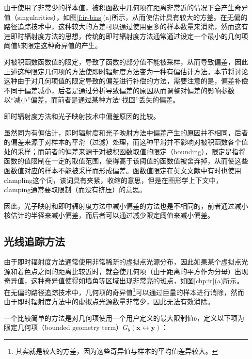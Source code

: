由于使用了非常少的样本值，被积函数中几何项在距离非常近的情况下会产生奇异值（singularities），如图\ref{f:ir-bias}(a)所示，从而使估计具有较大的方差。在无偏的路径追踪技术中，这种较大的方差可以通过使用更多的样本数量来消除，然而这有违即时辐射度方法的思想，传统的即时辐射度方法\cite{a:InstantRadiosity}通常通过设定一个最小的几何项阈值$b$来限定这种奇异值的产生。

对被积函数函数值的限定，导致了函数的部分值不能被采样，从而导致偏差，因此上述这种限定几何项的方法使即时辐射度方法变为一种有偏估计方法。本节将讨论这种由于对几何项值的限定导致的偏差进行补偿的方法，需要注意的是，偏差补偿不同于偏差减小，后者是通过分析导致偏差的原因从而调整对偏差的影响参数以“减小”偏差，而前者是通过某种方法“找回”丢失的偏差。

\begin{myshaded}
	\indent 即时辐射度方法和光子映射技术中偏差原因的比较。
	
	\indent 虽然同为有偏估计，即时辐射度和光子映射方法中偏差产生的原因并不相同，后者的偏差来源于对样本的平滑（过滤）处理，而这种平滑并不影响对被积函数各个值处的采样；而前者的偏差来源于对被积函数取值的限定（bounding），限定是指将函数的值限制在一定的取值范围，使得高于该阈值的函数值被舍弃掉，从而使这些函数值对应的样本不能被采样而形成偏差。函数值限定在英文文献中有时也使用clampling这个词，该词具有夹紧，收缩的意思，但是在图形学上下文中，clamping通常要取限制（而没有挤压）的意思。
	
	\indent 因此，光子映射和即时辐射度方法中减小偏差的方法也是不相同的，前者通过减小核估计的半径来减小偏差，而后者可以通过减少限定阈值来减小偏差。
\end{myshaded}





\subsection{光线追踪方法}
由于即时辐射度方法通常使用非常稀疏的虚拟点光源分布，因此如果某个虚拟点光源和着色点之间的距离比较近时，就会使几何项（由于距离的平方作为分母）出现奇异值，这种奇异值使得如墙角等区域出现非常亮的斑点，如图\ref{chp:ir}(a)所示。在无偏的路径追踪技术中，几何项的奇异值\footnote{其实就是较大的方差，因为这些奇异值与样本的平均值差异较大。}可以通过巨量的样本进行消除，然而由于即时辐射度方法中的虚拟点光源数量非常少，因此无法有效消除。

一个比较简单的方法是对几何项使用一个用户定义的最大限制值$b$，定义以下项为限定几何项（bounded geometry term）$G_b(\mathbf{x}\leftrightarrow\mathbf{y})$：

